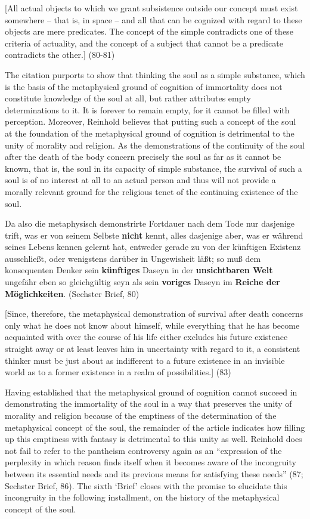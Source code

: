 [All actual objects to which we grant subsistence outside our concept must exist somewhere {--} that is, in space {--} and all that can be cognized with regard to these objects are mere predicates. The concept of the simple contradicts one of these criteria of actuality, and the concept of a subject that cannot be a predicate contradicts the other.] (80{-}81)

The citation purports to show that thinking the soul as a simple substance, which is the basis of the metaphysical ground of cognition of immortality does not constitute knowledge of the soul at all, but rather attributes empty determinations to it. It is forever to remain empty, for it cannot be filled with perception. Moreover, Reinhold believes that putting such a concept of the soul at the foundation of the metaphysical ground of cognition is detrimental to the unity of morality and religion. As the demonstrations of the continuity of the soul after the death of the body concern precisely the soul as far as it cannot be known, that is, the soul in its capacity of simple substance, the survival of such a soul is of no interest at all to an actual person and thus will not provide a morally relevant ground for the religious tenet of the continuing existence of the soul. 

Da also die metaphysisch demonstrirte Fortdauer nach dem Tode nur dasjenige trift, was er von seinem Selbste \textbf{nicht} kennt, alles dasjenige aber, was er w\"{a}hrend seines Lebens kennen gelernt hat, entweder gerade zu von der k\"{u}nftigen Existenz ausschlie\ss{}t, oder wenigstens dar\"{u}ber in Ungewisheit l\"{a}\ss{}t; so mu\ss{} dem konsequenten Denker sein \textbf{k\"{u}nftiges }Daseyn in der \textbf{unsichtbaren Welt} ungef\"{a}hr eben so gleichg\"{u}ltig seyn als sein \textbf{voriges} Daseyn im \textbf{Reiche der M\"{o}glichkeiten}. (Sechster Brief, 80)

[Since, therefore, the metaphysical demonstration of survival after death concerns only what he does not know about himself, while everything that he has become acquainted with over the course of his life either excludes his future existence straight away or at least leaves him in uncertainty with regard to it, a consistent thinker must be just about as indifferent to a future existence in an invisible world as to a former existence in a realm of possibilities.] (83)

Having established that the metaphysical ground of cognition cannot succeed in demonstrating the immortality of the soul in a way that preserves the unity of morality and religion because of the emptiness of the determination of the metaphysical concept of the soul, the remainder of the article indicates how filling up this emptiness with fantasy is detrimental to this unity as well. Reinhold does not fail to refer to the pantheism controversy again as an ``expression of the perplexity in which reason finds itself when it becomes aware of the incongruity between its essential needs and its previous means for satisfying these needs'' (87; Sechster Brief, 86). The sixth `Brief' closes with the promise to elucidate this incongruity in the following installment, on the history of the metaphysical concept of the soul. 


